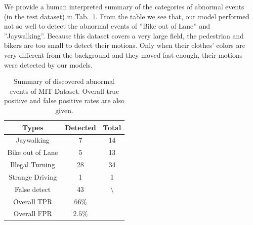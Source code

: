 We provide a human interpreted summary of the categories of abnormal events (in the test dataset) in Tab.~\ref{tab:mit_discovered_abnormal}. From the table we see that, our model performed not so well to detect the abnormal events of ''Bike out of Lane'' and ''Jaywalking''. Because this dataset covers a very large field, the pedestrian and bikers are too small to detect their motions. Only when their clothes' colors are very different from the background and they moved fast enough, their motions were detected by our models. 
\begin{table}[!htbp]
	\begin{center}
		\renewcommand\arraystretch{1}
		\setlength{\tabcolsep}{5pt}
		\begin{tabular}{|c| c|c|}
			\hline
			Types			& Detected		& Total\\
			\hline
			Jaywalking		 & 7			& 14\\
			Bike out of Lane & 5			& 13\\
			Illegal Turning  & 28			& 34\\
			Strange Driving  & 1            & 1\\
			False detect     & 43             & $\setminus$\\
			\hline
			Overall TPR     &$66\%$			&\\
			Overall FPR     &$2.5\%$			&\\
			\hline
		\end{tabular}
	\end{center}
	\caption[Summary of discovered abnormal events MIT Dataset]
	{Summary of discovered abnormal events of MIT Dataset. Overall true positive and false positive rates are also given.}
	\label{tab:mit_discovered_abnormal} 
\end{table}

